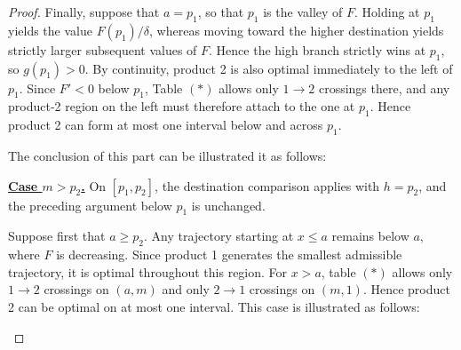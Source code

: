 \documentclass[11pt]{article}
\begin{document}
\begin{proof}
Finally, suppose that $a=p_1$, so that $p_1$ is the valley of $F$. Holding at $p_1$ yields the value $F(p_1)/\delta$, whereas moving toward the higher destination yields strictly larger subsequent values of $F$. Hence the high branch strictly wins at $p_1$, so $g(p_1)>0$. By continuity, product 2 is also optimal immediately to the left of $p_1$. Since $F'<0$ below $p_1$, Table $(*)$ allows only $1\to2$
crossings there, and any product-2 region on the left must therefore attach to the one at $p_1$. Hence product 2 can form at most one interval
below and across $p_1$.

The conclusion of this part can be illustrated it as follows: 

\begin{figure}[H]
\centering
{}
\end{figure}

\medskip\noindent\underline{\textbf{\boldmath Case $m>p_2$.}}
On $[p_1,p_2]$, the destination comparison applies with $h=p_2$, and the
preceding argument below $p_1$ is unchanged.

Suppose first that $a\geq p_2$. Any trajectory starting at $x\leq a$ remains below $a$, where $F$ is decreasing. Since product 1 generates the
smallest admissible trajectory, it is optimal throughout this region. For $x>a$, table $(*)$ allows only $1\to2$ crossings on $(a,m)$ and only
$2\to1$ crossings on $(m,1)$. Hence product 2 can be optimal on at most one interval. This case is illustrated as follows:


\begin{figure}[H]
\centering
{}
\end{figure}



\end{proof}
\end{document}
